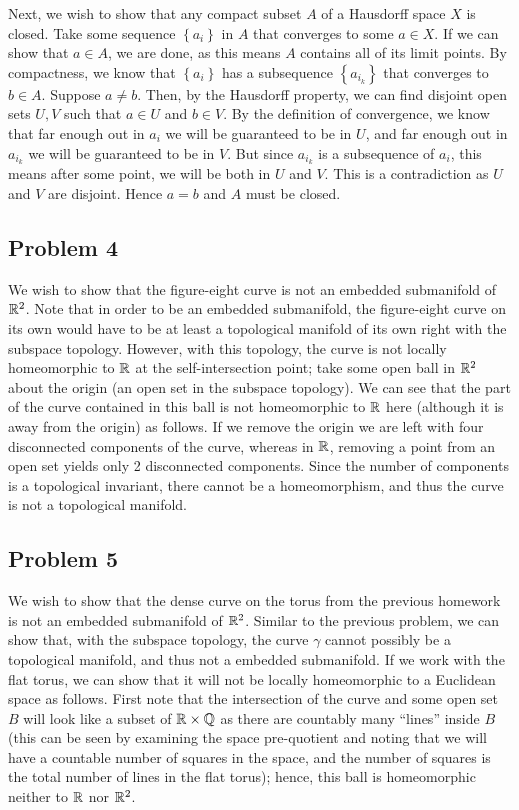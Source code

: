 \documentclass{../../mathnotes}
\begin{document}
Next, we wish to show that any compact subset $A$ of a Hausdorff space $X$ is closed. Take some sequence $\left\{ a_i \right\}$ in $A$ that
converges to some $a\in X$. If we can show that $a\in A$, we are done, as this means $A$ contains all of its limit points. By compactness,
we know that $\left\{ a_i \right\}$ has a subsequence $\left\{ a_{i_k} \right\}$ that converges to $b\in A$. Suppose $a\neq b$. Then, by the
Hausdorff property, we can find disjoint open sets $U,V$ such that $a\in U$ and $b\in V$. By the definition of convergence, we know that
far enough out in $a_i$ we will be guaranteed to be in $U$, and far enough out in $a_{i_k}$ we will be guaranteed to be in $V$. But
since $a_{i_k}$ is a subsequence of $a_i$, this means after some point, we will be both in $U$ and $V$. This is a contradiction as $U$ and $V$
are disjoint. Hence $a=b$ and $A$ must be closed.


\subsection*{Problem 4}

We wish to show that the figure-eight curve is not an embedded submanifold of $\mathbb{R}^2$. Note that in order to be an
embedded submanifold, the figure-eight curve on its own would have to be at least a topological manifold of its own right
with the subspace topology.
However, with this topology, the curve is not locally homeomorphic to $\mathbb{R}$ at the self-intersection point;
take some open ball in $\mathbb{R}^2$ about the origin (an open set in the subspace topology). We can see that the part of the curve contained 
in this ball is not homeomorphic to $\mathbb{R}$ here (although it is away from the origin) as follows.
If we remove the origin we are left with four disconnected components of the curve, whereas in $\mathbb{R}$,
removing a point from an open set yields only 2 disconnected components. Since the number of components is a topological invariant, there
cannot be a homeomorphism, and thus the curve is not a topological manifold.


\subsection*{Problem 5}

We wish to show that the dense curve on the torus from the previous homework is not an embedded submanifold of $\mathbb{R}^2$.
Similar to the previous problem, we can show that, with the subspace topology, the curve $\gamma$ cannot possibly
be a topological manifold, and thus not a embedded submanifold. If we work with the flat torus, we can show that
it will not be locally homeomorphic to a Euclidean space as follows.
First note that the intersection of the curve and some open set $B$ will look like a subset of $\mathbb{R}\times\mathbb{Q}$ as there are countably many ``lines'' inside $B$
(this can be seen by examining the space pre-quotient and noting that we will have a countable number of squares in the space, and the
number of squares is the total number of lines in the flat torus); hence, this ball is homeomorphic neither to $\mathbb{R}$ nor $\mathbb{R}^2$. 
\end{document}
